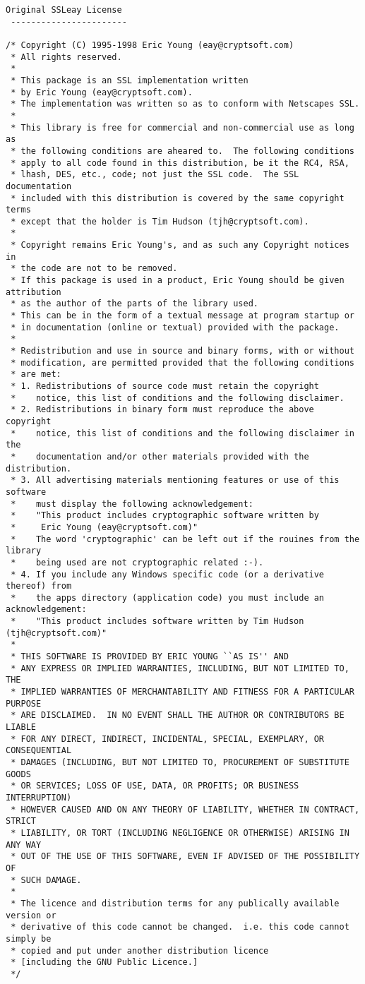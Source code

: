 \begin{lstlisting}[firstnumber=1,]
 Original SSLeay License
 -----------------------

/* Copyright (C) 1995-1998 Eric Young (eay@cryptsoft.com)
 * All rights reserved.
 *
 * This package is an SSL implementation written
 * by Eric Young (eay@cryptsoft.com).
 * The implementation was written so as to conform with Netscapes SSL.
 *
 * This library is free for commercial and non-commercial use as long as
 * the following conditions are aheared to.  The following conditions
 * apply to all code found in this distribution, be it the RC4, RSA,
 * lhash, DES, etc., code; not just the SSL code.  The SSL documentation
 * included with this distribution is covered by the same copyright terms
 * except that the holder is Tim Hudson (tjh@cryptsoft.com).
 *
 * Copyright remains Eric Young's, and as such any Copyright notices in
 * the code are not to be removed.
 * If this package is used in a product, Eric Young should be given attribution
 * as the author of the parts of the library used.
 * This can be in the form of a textual message at program startup or
 * in documentation (online or textual) provided with the package.
 *
 * Redistribution and use in source and binary forms, with or without
 * modification, are permitted provided that the following conditions
 * are met:
 * 1. Redistributions of source code must retain the copyright
 *    notice, this list of conditions and the following disclaimer.
 * 2. Redistributions in binary form must reproduce the above copyright
 *    notice, this list of conditions and the following disclaimer in the
 *    documentation and/or other materials provided with the distribution.
 * 3. All advertising materials mentioning features or use of this software
 *    must display the following acknowledgement:
 *    "This product includes cryptographic software written by
 *     Eric Young (eay@cryptsoft.com)"
 *    The word 'cryptographic' can be left out if the rouines from the library
 *    being used are not cryptographic related :-).
 * 4. If you include any Windows specific code (or a derivative thereof) from
 *    the apps directory (application code) you must include an acknowledgement:
 *    "This product includes software written by Tim Hudson (tjh@cryptsoft.com)"
 *
 * THIS SOFTWARE IS PROVIDED BY ERIC YOUNG ``AS IS'' AND
 * ANY EXPRESS OR IMPLIED WARRANTIES, INCLUDING, BUT NOT LIMITED TO, THE
 * IMPLIED WARRANTIES OF MERCHANTABILITY AND FITNESS FOR A PARTICULAR PURPOSE
 * ARE DISCLAIMED.  IN NO EVENT SHALL THE AUTHOR OR CONTRIBUTORS BE LIABLE
 * FOR ANY DIRECT, INDIRECT, INCIDENTAL, SPECIAL, EXEMPLARY, OR CONSEQUENTIAL
 * DAMAGES (INCLUDING, BUT NOT LIMITED TO, PROCUREMENT OF SUBSTITUTE GOODS
 * OR SERVICES; LOSS OF USE, DATA, OR PROFITS; OR BUSINESS INTERRUPTION)
 * HOWEVER CAUSED AND ON ANY THEORY OF LIABILITY, WHETHER IN CONTRACT, STRICT
 * LIABILITY, OR TORT (INCLUDING NEGLIGENCE OR OTHERWISE) ARISING IN ANY WAY
 * OUT OF THE USE OF THIS SOFTWARE, EVEN IF ADVISED OF THE POSSIBILITY OF
 * SUCH DAMAGE.
 *
 * The licence and distribution terms for any publically available version or
 * derivative of this code cannot be changed.  i.e. this code cannot simply be
 * copied and put under another distribution licence
 * [including the GNU Public Licence.]
 */
\end{lstlisting}
